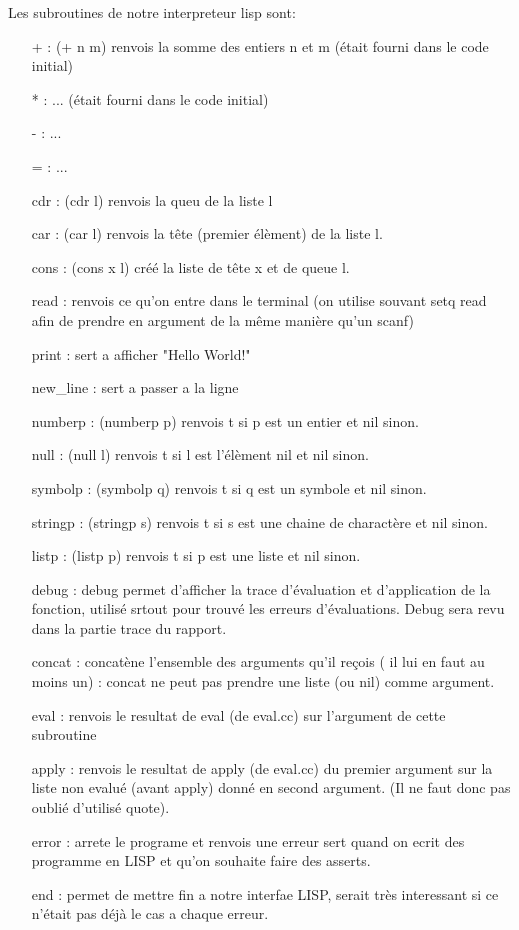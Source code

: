 \documentclass[a4paper]{article}
\begin{document}
Les subroutines de notre interpreteur lisp sont:
\begin{itemize}
	\item[+] : (+ n m) renvois la somme des entiers n et m (était fourni dans le code initial)
	\item[*] : ... (était fourni dans le code initial)
	\item[-] : ...
	\item[=] : ...
	\item[cdr] : (cdr l) renvois la queu de la liste l
	\item[car] : (car l) renvois la tête (premier élèment) de la liste l.
	\item[cons] : (cons x l) créé la liste de tête x et de queue l.
	\item[read] : renvois ce qu'on entre dans le terminal (on utilise souvant setq read afin de prendre en argument de la même manière qu'un scanf)
	\item[print] : sert a afficher "Hello World!"
	\item[new\_line] : sert a passer a la ligne
	\item[numberp] : (numberp p) renvois t si p est un entier et nil sinon.
	\item[null] : (null l) renvois t si l est l'élèment nil et nil sinon.	
	\item[symbolp] : (symbolp q) renvois t si q est un symbole et nil sinon.
	\item[stringp] : (stringp s) renvois t si s est une chaine de charactère et nil sinon.
	\item[listp] : (listp p) renvois t si p est une liste et nil sinon.
	\item[debug] : debug permet d'afficher la trace d'évaluation et d'application de la fonction, utilisé srtout pour trouvé les erreurs d'évaluations. Debug sera revu dans la partie trace du rapport.
	\item[concat] : concatène l'ensemble des arguments qu'il reçois ( il lui en faut au moins un) : concat ne peut pas prendre une liste (ou nil) comme argument.
	\item[eval] : renvois le resultat de eval (de eval.cc) sur l'argument de cette subroutine
	\item[apply] : renvois le resultat de apply (de eval.cc) du premier argument sur la liste non evalué (avant apply) donné en second argument. (Il ne faut donc pas oublié d'utilisé quote).
	\item[error] : arrete le programe et renvois une erreur sert quand on ecrit des programme en LISP et qu'on souhaite faire des asserts.
	\item[end] : permet de mettre fin a notre interfae LISP, serait très interessant si ce n'était pas déjà le cas a chaque erreur.
	
	
\end{itemize}
\end{document}
